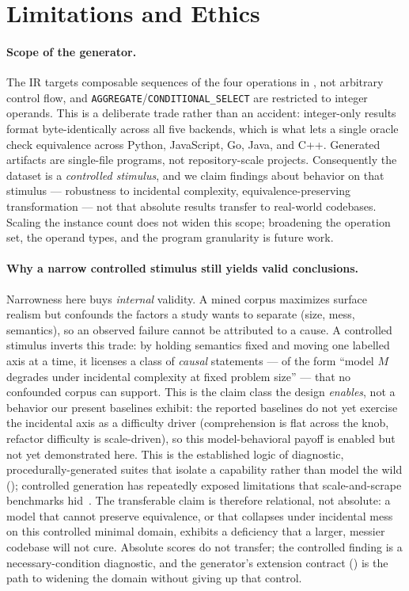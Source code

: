 
\section{Limitations and Ethics}
\label{sec:limits}

\paragraph{Scope of the generator.} The IR targets composable sequences of the four
operations in , not arbitrary control flow, and
\texttt{AGGREGATE}/\texttt{CONDITIONAL\_SELECT} are restricted to integer operands. This
is a deliberate trade rather than an accident: integer-only results format
byte-identically across all five backends, which is what lets a single oracle check
equivalence across Python, JavaScript, Go, Java, and C++. Generated artifacts are
single-file programs, not repository-scale projects. Consequently the dataset is a
\emph{controlled stimulus}, and we claim findings about behavior on that stimulus ---
robustness to incidental complexity, equivalence-preserving transformation --- not that
absolute results transfer to real-world codebases. Scaling the instance count does not
widen this scope; broadening the operation set, the operand types, and the program
granularity is future work.

\paragraph{Why a narrow controlled stimulus still yields valid conclusions.} Narrowness
here buys \emph{internal} validity. A mined corpus maximizes surface
realism but confounds the factors a study wants to separate (size, mess, semantics), so an
observed failure cannot be attributed to a cause. A controlled stimulus inverts this trade:
by holding semantics fixed and moving one labelled axis at a time, it licenses a class of
\emph{causal} statements --- of the form ``model $M$ degrades under incidental complexity at
fixed problem size'' --- that no confounded corpus can support. This is the claim class the
design \emph{enables}, not a behavior our present baselines exhibit: the reported baselines do
not yet exercise the incidental axis as a difficulty driver (comprehension is flat across the
knob, refactor difficulty is scale-driven), so this model-behavioral payoff is enabled but not
yet demonstrated here. This is the established logic of diagnostic,
procedurally-generated suites that isolate a capability rather than model the wild
(); controlled generation has repeatedly exposed limitations that
scale-and-scrape benchmarks hid~\citep{mirzadeh2024gsm}. The transferable claim is therefore
relational, not absolute: a model that cannot preserve equivalence, or that collapses under
incidental mess on this controlled minimal domain, exhibits a deficiency that a larger,
messier codebase will not cure. Absolute scores do not transfer; the controlled finding is a
necessary-condition diagnostic, and the generator's extension contract ()
is the path to widening the domain without giving up that control.

